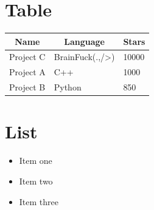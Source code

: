 \documentclass[12pt]{ctexart}
\newcommand{\tabularcenter}[1]{\multicolumn{1}{c}{#1}}
\begin{document}
	\section{Table}
	
	\begin{center}
		\begin{tabular}{lll}
			\toprule
			 \tabularcenter{Name} & \tabularcenter{Language} & \tabularcenter{Stars} \\
			\midrule
			Project C & BrainFuck(.,/>) & 10000 \\
			Project A & C++ & 1000 \\
			Project B & Python & 850 \\
			\bottomrule
		\end{tabular}
	\end{center}
	
	\section{List}
	
	\begin{itemize}
		\item Item one
		\item Item two
		\item Item three
	\end{itemize}
	\printbibliography
\end{document}

